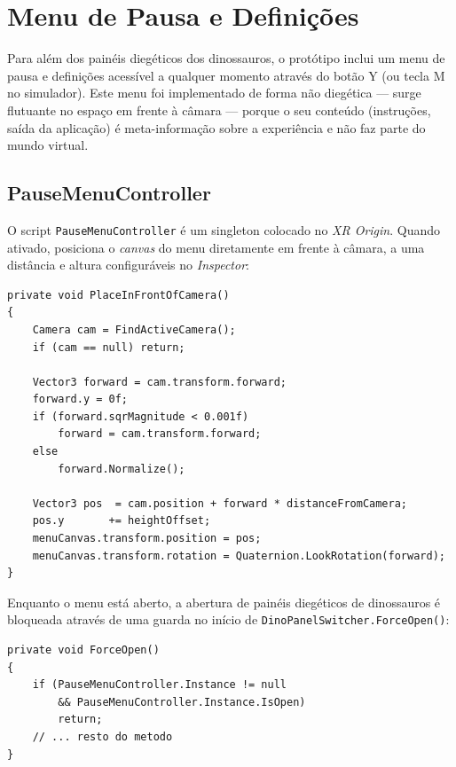 \documentclass[a4paper,11pt]{report}
\newcommand{\code}[1]{\texttt{#1}}
\begin{document}
\section{Menu de Pausa e Definições}
\label{sec:pausemenu}

Para além dos painéis diegéticos dos dinossauros, o protótipo inclui um
menu de pausa e definições acessível a qualquer momento através do botão Y
(ou tecla M no simulador). Este menu foi implementado de forma não diegética
--- surge flutuante no espaço em frente à câmara --- porque o seu conteúdo
(instruções, saída da aplicação) é meta-informação sobre a experiência e não
faz parte do mundo virtual.

\subsection{PauseMenuController}

O script \code{PauseMenuController} é um singleton colocado no \textit{XR Origin}.
Quando ativado, posiciona o \textit{canvas} do menu diretamente em frente à câmara,
a uma distância e altura configuráveis no \textit{Inspector}:

\begin{lstlisting}[caption={Posicionamento do menu em frente à câmara (PauseMenuController.cs).},
                   label={lst:pausemenu}]
private void PlaceInFrontOfCamera()
{
    Camera cam = FindActiveCamera();
    if (cam == null) return;

    Vector3 forward = cam.transform.forward;
    forward.y = 0f;
    if (forward.sqrMagnitude < 0.001f)
        forward = cam.transform.forward;
    else
        forward.Normalize();

    Vector3 pos  = cam.position + forward * distanceFromCamera;
    pos.y       += heightOffset;
    menuCanvas.transform.position = pos;
    menuCanvas.transform.rotation = Quaternion.LookRotation(forward);
}
\end{lstlisting}

Enquanto o menu está aberto, a abertura de painéis diegéticos de dinossauros
é bloqueada através de uma guarda no início de \code{DinoPanelSwitcher.ForceOpen()}:

\begin{lstlisting}[caption={Guarda que impede abertura de painéis enquanto o menu está aberto.},
                   label={lst:menuguard}]
private void ForceOpen()
{
    if (PauseMenuController.Instance != null
        && PauseMenuController.Instance.IsOpen)
        return;
    // ... resto do metodo
}
\end{lstlisting}
\end{document}

